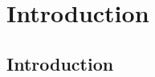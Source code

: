 \documentclass[10pt,a4paper]{report}
\begin{document}
	\tableofcontents
	
	
	\pagestyle{fancy}
	\fancyhead{} %
	\fancyfoot{} %
	\renewcommand{\headrulewidth}{0.4pt}
	\renewcommand{\footrulewidth}{0.4pt}
	
	\fancyhead[L]{\rightmark}
	\fancyfoot[C]{\thepage}
	
	
	\clearpage
	
	\chapter{Introduction}
	\label{chap:Introduction}
	
	\section{Introduction}
	\label{IDsec:Introduction}
	
\end{document}
